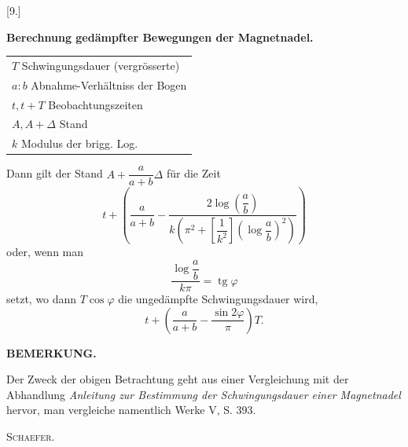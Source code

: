 \clearpage\begingroup{}\HistoricalFoot{}{9\textsuperscript{*}}
\begin{center}[9.]\end{center}
\noindent{\small [S. 217]}
\begin{center}\textbf{Berechnung gedämpfter Bewegungen der Magnetnadel.}\end{center}
\noindent\hspace*{\parindent}\begin{tabular}{@{}l@{}}
\(T\) Schwingungsdauer (vergrösserte)\\
\(a:b\) Abnahme-Verhältniss der Bogen\\
\(t,t+T\) Beobachtungszeiten\\
\(A,A+\Delta\) Stand\\
\(k\) Modulus der brigg. Log.
\end{tabular}\par
\indent Dann gilt der Stand \(A+\dfrac{a}{a+b}\Delta\) für die Zeit
\[
t+\left(\frac{a}{a+b}-\frac{2\log\left(\dfrac ab\right)}{k\left(\pi^2+\left[\dfrac1{k^2}\right]\left(\log\dfrac ab\right)^2\right)}\right)
\]
\noindent oder, wenn man
\[
\frac{\log\dfrac ab}{k\pi}=\operatorname{tg}\varphi
\]
\clearpage{}
\noindent setzt, wo dann \(T\cos\varphi\) die ungedämpfte Schwingungsdauer wird,
\[
t+\left(\frac{a}{a+b}-\frac{\sin2\varphi}{\pi}\right)T.
\]
\bigskip\begin{center}\textbf{BEMERKUNG.}\end{center}
{\small\noindent\hspace*{\parindent}Der Zweck der obigen Betrachtung geht aus einer Vergleichung mit der Abhandlung \textit{Anleitung zur
Bestimmung der Schwingungsdauer einer Magnetnadel} hervor, man vergleiche namentlich Werke V, S. 393.
\par\raggedleft\textsc{Schaefer}.\par}
\clearpage\endgroup
